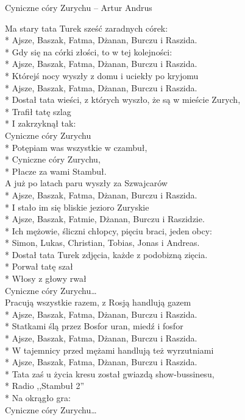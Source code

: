\begin{piosenka_dluga}{Cyniczne córy Zurychu -- Artur Andrus}

Ma stary tata Turek sześć zaradnych córek: \\*
Ajsze, Baszak, Fatma, Dżanan, Burczu i Raszida. \\*
Gdy się na córki złości, to w tej kolejności: \\*
Ajsze, Baszak, Fatma, Dżanan, Burczu i Raszida. \\*
Którejś nocy wyszły z domu i uciekły po kryjomu \\*
Ajsze, Baszak, Fatma, Dżanan, Burczu i Raszida. \\*
Dostał tata wieści, z których wyszło, że są w mieście Zurych, \\*
Trafił tatę szlag \\*
I zakrzyknął tak: \\[\zwrotkaspace]
 
 Cyniczne córy Zurychu  \\*
 Potępiam was wszystkie w czambuł, \\*
 Cyniczne córy Zurychu, \\*
 Płacze za wami Stambuł. \\[\zwrotkaspace]

A już po latach paru wyszły za Szwajcarów \\*
Ajsze, Baszak, Fatma, Dżanan, Burczu i Raszida. \\*
I stało im się bliskie jezioro Zuryskie \\*
Ajsze, Baszak, Fatmie, Dżanan, Burczu i Raszidzie. \\*
Ich mężowie, śliczni chłopcy, pięciu braci, jeden obcy: \\*
Simon, Lukas, Christian, Tobias, Jonas i Andreas. \\*
Dostał tata Turek zdjęcia, każde z podobizną zięcia. \\*
Porwał tatę szał \\*
Włosy z głowy rwał \\[\zwrotkaspace]

 Cyniczne córy Zurychu\ldots \\[\zwrotkaspace]
 
Pracują wszystkie razem, z Rosją handlują gazem \\*
Ajsze, Baszak, Fatma, Dżanan, Burczu i Raszida. \\*
Statkami ślą przez Bosfor uran, miedź i fosfor \\*
Ajsze, Baszak, Fatma, Dżanan, Burczu i Raszida. \\*
W tajemnicy przed mężami handlują też wyrzutniami \\*
Ajsze, Baszak, Fatma, Dżanan, Burczu i Raszida. \\*
Tata zaś u życia kresu został gwiazdą show-bussinesu, \\*
Radio ,,Stambuł 2'' \\*
Na okrągło gra: \\[\zwrotkaspace]
 
 Cyniczne córy Zurychu\ldots \\[\zwrotkaspace]

\end{piosenka_dluga} 